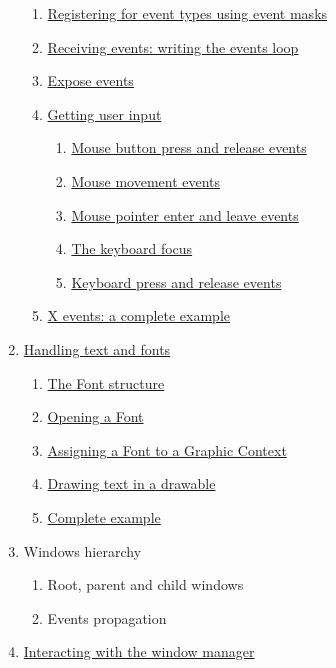 \documentclass[12pt,oneside,titlepage]{book}
\providecommand{\tightlist}{%
  \setlength{\itemsep}{0pt}\setlength{\parskip}{0pt}}
\begin{document}
\begin{enumerate}
  \begin{enumerate}
  \tightlist
  \item
    \protect\hyperlink{register}{Registering for event types using event
    masks}
  \item
    \protect\hyperlink{loop}{Receiving events: writing the events loop}
  \item
    \protect\hyperlink{expose}{Expose events}
  \item
    \protect\hyperlink{userinput}{Getting user input}

    \begin{enumerate}
    \tightlist
    \item
      \protect\hyperlink{mousepressrelease}{Mouse button press and
      release events}
    \item
      \protect\hyperlink{mousemvnt}{Mouse movement events}
    \item
      \protect\hyperlink{mouseenter}{Mouse pointer enter and leave
      events}
    \item
      \protect\hyperlink{focus}{The keyboard focus}
    \item
      \protect\hyperlink{keypress}{Keyboard press and release events}
    \end{enumerate}
  \item
    \protect\hyperlink{eventex}{X events: a complete example}
  \end{enumerate}
\item
  \protect\hyperlink{font}{Handling text and fonts}

  \begin{enumerate}
  \tightlist
  \item
    \protect\hyperlink{fontstruct}{The Font structure}
  \item
    \protect\hyperlink{openingfont}{Opening a Font}
  \item
    \protect\hyperlink{assigningfont}{Assigning a Font to a Graphic
    Context}
  \item
    \protect\hyperlink{drawingtext}{Drawing text in a drawable}
  \item
    \protect\hyperlink{fontcompleteexample}{Complete example}
  \end{enumerate}
\item
  Windows hierarchy

  \begin{enumerate}
  \tightlist
  \item
    Root, parent and child windows
  \item
    Events propagation
  \end{enumerate}
\item
  \protect\hyperlink{wm}{Interacting with the window manager}


\end{enumerate}
\end{document}
